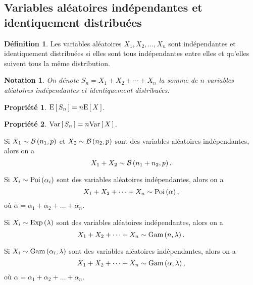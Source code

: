 \documentclass[11pt]{article}
\makeatletter
\newcommand\Bin[2]{%
	\ensuremath{%
		\mathcal{B}\left(#1,#2\right)%
	}%
}%
\newcommand\Poi[1]{%
	\ensuremath{%
		\mathrm{Poi}\left(#1\right)%
	}%
}%
\newcommand\Exp[1]{%
	\ensuremath{%
		\mathrm{Exp}\left(#1\right)%
	}%
}%
\newcommand\Gam[2]{%
	\ensuremath{%
		\mathrm{Gam}\left(#1,#2\right)%
	}%
}%
\newcommand\Esp[1]{%
	\ensuremath{%
		\mathrm{E}\left[\,#1\,\right]%
	}%
}%
\newcommand\Var[1]{%
	\ensuremath{%
		\mathrm{Var}\left[\,#1\,\right]%
	}%
}%
\newtheorem*{notation}{Notation}
\newtheorem{property}{Propriété}
\theoremstyle{remark}
\theoremstyle{definition}
\newtheorem*{@definition}{Définition}
\newenvironment{definition}{%
	\begin{@definition}%
}{%
	\end{@definition}%
	\setcounter{property}{0}%
}
\makeatother
\begin{document}
\subsection{Variables aléatoires indépendantes et identiquement distribuées}
\begin{definition}
	Les variables aléatoires $X_1,X_2,\dots,X_n$ sont indépendantes et
	identiquement distribuées si elles sont tous indépendantes entre elles et
	qu'elles suivent tous la même distribution.
\end{definition}

\begin{notation}
	On dénote $S_n=X_1+X_2+\cdots+X_n$ la somme de $n$ variables aléatoires
	indépendantes et identiquement distribuées.
\end{notation}

\begin{property}
	$\Esp{S_n}=n\Esp{X}$.
\end{property}

\begin{property}
	$\Var{S_n}=n\Var{X}$.
\end{property}

\begin{exemple}
	Si $X_1\sim\Bin{n_1}{p}$ et $X_2\sim\Bin{n_2}{p}$ sont des variables
	aléatoires indépendantes, alors on a
	\begin{equation*}
		X_1+X_2\sim\Bin{n_1+n_2}{p}.
	\end{equation*}
\end{exemple}

\begin{exemple}
	Si $X_i\sim\Poi{\alpha_i}$ sont des variables aléatoires indépendantes,
	alors on a
	\begin{equation*}
		X_1+X_2+\dots+X_n\sim\Poi{\alpha},
	\end{equation*}
	où $\alpha=\alpha_1+\alpha_2+\dots+\alpha_n$.
\end{exemple}

\begin{exemple}
	Si $X_i\sim\Exp{\lambda}$ sont des variables aléatoires indépendantes,
	alors on a
	\begin{equation*}
		X_1+X_2+\dots+X_n\sim\Gam{n}{\lambda}.
	\end{equation*}
\end{exemple}

\begin{exemple}
	Si $X_i\sim\Gam{\alpha_i}{\lambda}$ sont des variables aléatoires
	indépendantes, alors on a
	\begin{equation*}
		X_1+X_2+\dots+X_n\sim\Gam{\alpha}{\lambda},
	\end{equation*}
	où $\alpha=\alpha_1+\alpha_2+\dots+\alpha_n$.
\end{exemple}
\end{document}
